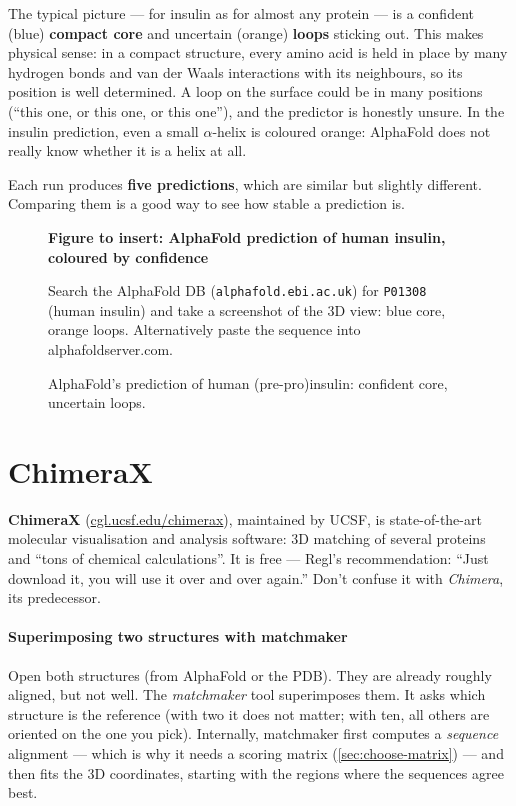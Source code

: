 \documentclass[11pt, oneside]{book}
\newcommand{\figureplaceholder}[5]{%
\begin{figure}[htbp]
\centering
\begin{tcolorbox}[unbreakable,width=\linewidth,height=#1,colback=accent!3,
  colframe=accent!30,boxrule=0.5pt,arc=2.5mm,sharp corners=all,
  valign=center,halign=center,fontupper=\small]
{\bfseries\color{accent}Figure to insert: #2}\par\medskip
{\color{gray!75!black}#3}
\end{tcolorbox}
\caption{#4}\label{#5}
\end{figure}}
\let\originalsection\section
\renewcommand{\section}{\Needspace{7\baselineskip}\originalsection}
\begin{document}
The typical picture --- for insulin as for almost any protein --- is a
confident (blue) \textbf{compact core} and uncertain (orange)
\textbf{loops} sticking out. This makes physical sense: in a compact
structure, every amino acid is held in place by many hydrogen bonds and van der
Waals interactions with its neighbours, so its position is well determined. A
loop on the surface could be in many positions (``this one, or this one, or
this one''), and the predictor is honestly unsure. In the insulin prediction,
even a small $\alpha$-helix is coloured orange: AlphaFold does not really know
whether it is a helix at all.

Each run produces \textbf{five predictions}, which are similar but slightly
different. Comparing them is a good way to see how stable a prediction is.

\figureplaceholder{4.5cm}{AlphaFold prediction of human insulin, coloured by confidence}%
{Search the AlphaFold DB (\texttt{alphafold.ebi.ac.uk}) for \texttt{P01308}
(human insulin) and take a screenshot of the 3D view: blue core, orange loops.
Alternatively paste the sequence into alphafoldserver.com.}%
{AlphaFold's prediction of human (pre-pro)insulin: confident core, uncertain
loops.}{fig:af-insulin}

\section{ChimeraX}
\label{sec:chimerax}

\textbf{ChimeraX} (\url{cgl.ucsf.edu/chimerax}), maintained by UCSF, is
state-of-the-art molecular visualisation and analysis software: 3D matching of
several proteins and ``tons of chemical calculations''. It is free --- Regl's
recommendation: ``Just download it, you will use it over and over again.''
Don't confuse it with \emph{Chimera}, its predecessor.

\paragraph{Superimposing two structures with matchmaker}
Open both structures (from AlphaFold or the PDB). They are already roughly
aligned, but not well. The \emph{matchmaker} tool superimposes them. It asks
which structure is the reference (with two it does not matter; with ten, all
others are oriented on the one you pick). Internally, matchmaker first computes
a \emph{sequence} alignment --- which is why it needs a scoring matrix
(\cref{sec:choose-matrix}) --- and then fits the 3D coordinates, starting with
the regions where the sequences agree best.
\end{document}
